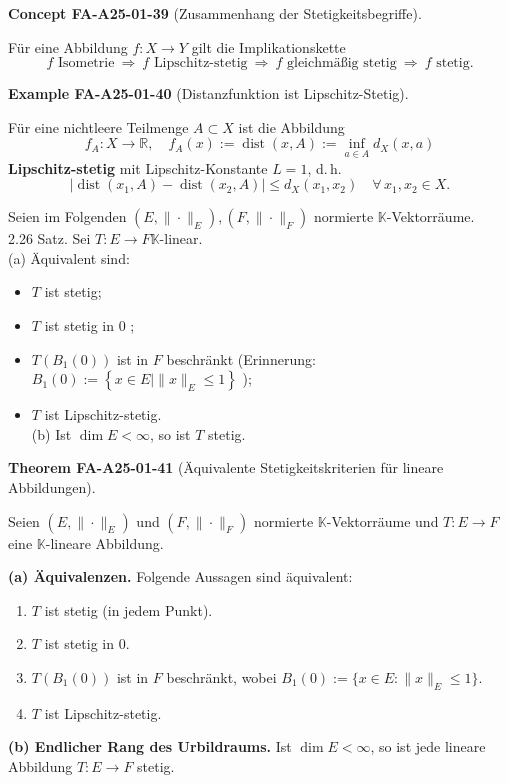 \documentclass[10pt, letterpaper]{article}
\newcommand{\CustomHeading}[3]{%
  \par\medskip\noindent%
  \textbf{#1 #2} \textnormal{(#3)}.\enskip%
}
\newenvironment{THEO}[2]{\begin{unitbox}\CustomHeading{Theorem}{#1}{#2}}{\end{unitbox}}
\newenvironment{EXA}[2]{\begin{unitbox}\CustomHeading{Example}{#1}{#2}}{\end{unitbox}}
\newenvironment{CONC}[2]{\begin{unitbox}\CustomHeading{Concept}{#1}{#2}}{\end{unitbox}}
\begin{document}
\begin{CONC}{FA-A25-01-39}{Zusammenhang der Stetigkeitsbegriffe}
Für eine Abbildung $f:X\to Y$ gilt die Implikationskette
\[
f\text{ Isometrie}\ \Longrightarrow\ f\text{ Lipschitz-stetig}\ \Longrightarrow\ f\text{ gleichmäßig stetig}\ \Longrightarrow\ f\text{ stetig.}
\]
\end{CONC}


\begin{EXA}{FA-A25-01-40}{Distanzfunktion ist Lipschitz-Stetig}
Für eine nichtleere Teilmenge $A\subset X$ ist die Abbildung
\[
f_A:X\to\mathbb{R},\quad f_A(x):=\operatorname{dist}(x,A):=\inf_{a\in A} d_X(x,a)
\]
\textbf{Lipschitz-stetig} mit Lipschitz-Konstante $L=1$, d.\,h.
\[
|\operatorname{dist}(x_1,A)-\operatorname{dist}(x_2,A)|\le d_X(x_1,x_2)
\quad\forall\,x_1,x_2\in X.
\]
\end{EXA}



Seien im Folgenden $\left(E,\|\cdot\|_{E}\right),\left(F,\|\cdot\|_{F}\right)$ normierte $\mathbb{K}$-Vektorräume.\\
2.26 Satz. Sei $T: E \rightarrow F \mathbb{K}$-linear.\\
(a) Äquivalent sind:

\begin{itemize}
  \item $T$ ist stetig;
  \item $T$ ist stetig in 0 ;
  \item $T\left(B_{1}(0)\right)$ ist in $F$ beschränkt (Erinnerung: $B_{1}(0):=\left\{x \in E \mid\|x\|_{E} \leq 1\right\}$ );
  \item $T$ ist Lipschitz-stetig.\\
(b) Ist $\operatorname{dim} E<\infty$, so ist $T$ stetig.
\end{itemize}



\begin{THEO}{FA-A25-01-41}{Äquivalente Stetigkeitskriterien für lineare Abbildungen}
Seien $(E,\|\cdot\|_{E})$ und $(F,\|\cdot\|_{F})$ normierte $\mathbb{K}$-Vektorräume und $T:E\to F$ eine $\mathbb{K}$-lineare Abbildung.

\textbf{(a) Äquivalenzen.}
Folgende Aussagen sind äquivalent:
\begin{enumerate}
\item[(i)] $T$ ist stetig (in jedem Punkt).
\item[(ii)] $T$ ist stetig in $0$.
\item[(iii)] $T(B_1(0))$ ist in $F$ beschränkt, wobei $B_1(0):=\{x\in E:\|x\|_{E}\le 1\}$.
\item[(iv)] $T$ ist Lipschitz-stetig.
\end{enumerate}

\textbf{(b) Endlicher Rang des Urbildraums.}
Ist $\dim E<\infty$, so ist jede lineare Abbildung $T:E\to F$ stetig.
\end{THEO}
\end{document}
